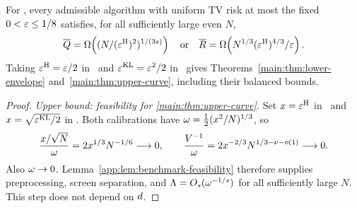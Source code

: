 \begin{corollary}
For \HellingerCase, every admissible algorithm with uniform TV risk
at most the fixed $0<\varepsilon\le1/8$ satisfies, for all
sufficiently large even $N$,
\begin{equation}
 \overline Q=\Omega\!\left(
  (N/(\varepsilon^{\mathrm H})^2)^{1/(3s)}\right)
 \quad\text{or}\quad
 \overline R=\Omega\!\left(
  N^{1/3}(\varepsilon^{\mathrm H})^{4/3}/\varepsilon\right).
 \label{app:eq:fixed-accuracy-lower}
\end{equation}
Taking $\varepsilon^{\mathrm H}=\varepsilon/2$ in \HellingerCase\ and
$\varepsilon^{\mathrm{KL}}=\varepsilon^2/2$ in \KLCase\ gives
Theorems~\ref{main:thm:lower-envelope}
and~\ref{main:thm:upper-curve}, including their balanced bounds.
\end{corollary}

\begin{proof}
\emph{Upper bound: feasibility for \cref{main:thm:upper-curve}.}
Set $x=\varepsilon^{\mathrm H}$ in \HellingerCase\ and
$x=\sqrt{\varepsilon^{\mathrm{KL}}/2}$ in \KLCase.
Both calibrations have
$\omega=\frac12(x^2/N)^{1/3}$, so
\[
 \frac{x/\sqrt N}{\omega}
 =2x^{1/3}N^{-1/6}\longrightarrow0,
 \qquad
 \frac{V^{-1}}{\omega}
 =2x^{-2/3}N^{1/3-\nu-o(1)}
 \longrightarrow0.
\]
Also $\omega\to0$.
Lemma~\ref{app:lem:benchmark-feasibility} therefore supplies preprocessing,
screen separation, and
$\Lambda=O_{s}
(\omega^{-1/s})$ for all sufficiently large $N$.
This step does not depend on $d$.


\end{proof}
